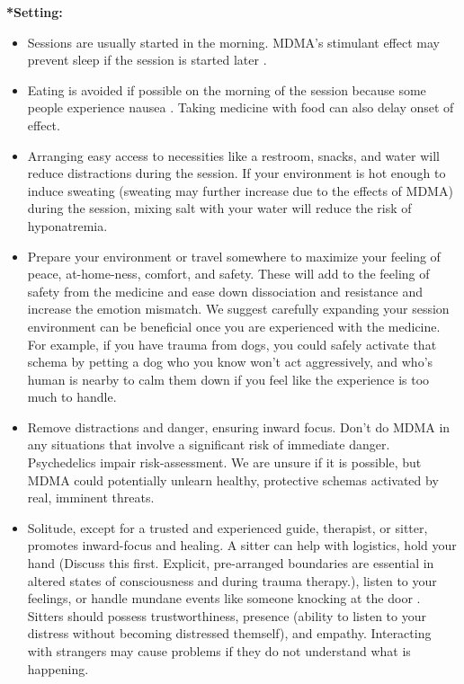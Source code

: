 \documentclass[12pt,letterpaper]{article}
\begin{document}
\noindent \textbf{*Setting:}
\begin{itemize}
    \item Sessions are usually started in the morning. MDMA's stimulant effect may prevent sleep if the session is started later \cite{berro2018acute}.
    \item Eating is avoided if possible on the morning of the session because some people experience nausea \cite{mithoeferManual}. Taking medicine with food can also delay onset of effect.
    \item Arranging easy access to necessities like a restroom, snacks, and water will reduce distractions during the session. If your environment is hot enough to induce sweating (sweating may further increase due to the effects of MDMA) during the session, mixing salt with your water will reduce the risk of hyponatremia.
    \label{contextexpansion}
    \item Prepare your environment or travel somewhere to maximize your feeling of peace, at-home-ness, comfort, and safety. These will add to the feeling of safety from the medicine and ease down dissociation and resistance and increase the emotion mismatch. We suggest carefully expanding your session environment can be beneficial once you are experienced with the medicine. For example, if you have trauma from dogs, you could safely activate that schema by petting a dog who you know won't act aggressively, and who's human is nearby to calm them down if you feel like the experience is too much to handle.
    \item Remove distractions and danger, ensuring inward focus. Don’t do MDMA in any situations that involve a significant risk of immediate danger. Psychedelics impair risk-assessment. We are unsure if it is possible, but MDMA could potentially unlearn healthy, protective schemas activated by real, imminent threats.
\label{def:sitter}
    \item Solitude, except for a trusted and experienced guide, therapist, or sitter, promotes inward-focus and healing. A sitter can help with logistics, hold your hand (Discuss this first. Explicit, pre-arranged boundaries are essential in altered states of consciousness and during trauma therapy.), listen to your feelings, or handle mundane events like someone knocking at the door \cite{mithoeferManual,thalSitter}. Sitters should possess trustworthiness, presence (ability to listen to your distress without becoming distressed themself), and empathy. Interacting with strangers may cause problems if they do not understand what is happening.  
\end{itemize}
\end{document}
